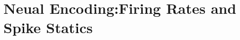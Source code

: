 \documentclass[letterpaper,oneside]{book}
\makeatletter
\newcommand{\voidenvironment}[1]{%
  \expandafter\providecommand\csname env@#1@save@env\endcsname{}%
  \expandafter\providecommand\csname env@#1@process\endcsname{}%
  \@ifundefined{#1}{}{\RenewEnviron{#1}{}}%
}
\numberwithin{equation}{chapter}
\theoremstyle{definition}
\makeatother
\begin{document}
\pagestyle{empty}


\pagestyle{fancy}
\fancyhead{}




\chapter{Neual Encoding:Firing Rates and Spike Statics}
\label{cha:Firing Rates and Spike Statics}
\end{document}
